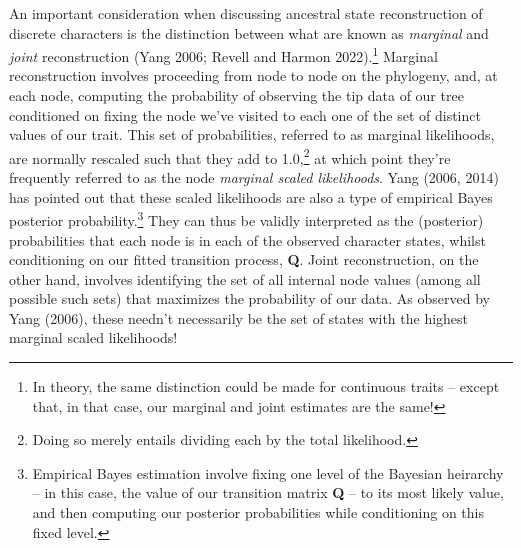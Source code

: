 \documentclass{article}
\begin{document}
An important consideration when discussing ancestral state reconstruction of discrete characters is the distinction between what are known as \emph{marginal} and \emph{joint} reconstruction (Yang 2006; Revell and Harmon 2022).\footnote{In theory, the same distinction could be made for continuous traits -- except that, in that case, our marginal and joint estimates are the same!} Marginal reconstruction involves proceeding from node to node on the phylogeny, and, at each node, computing the probability of observing the tip data of our tree conditioned on fixing the node we've visited to each one of the set of distinct values of our trait. This set of probabilities, referred to as marginal likelihoods, are normally rescaled such that they add to 1.0,\footnote{Doing so merely entails dividing each by the total likelihood.} at which point they're frequently referred to as the node \emph{marginal scaled likelihoods}. Yang (2006, 2014) has pointed out that these scaled likelihoods are also a type of empirical Bayes posterior probability.\footnote{Empirical Bayes estimation involve fixing one level of the Bayesian heirarchy -- in this case, the value of our transition matrix \textbf{Q} -- to its most likely value, and then computing our posterior probabilities while conditioning on this fixed level.} They can thus be validly interpreted as the (posterior) probabilities that each node is in each of the observed character states, whilst conditioning on our fitted transition process, \textbf{Q}. Joint reconstruction, on the other hand, involves identifying the set of all internal node values (among all possible such sets) that maximizes the probability of our data. As observed by Yang (2006), these needn't necessarily be the set of states with the highest marginal scaled likelihoods!
\end{document}
